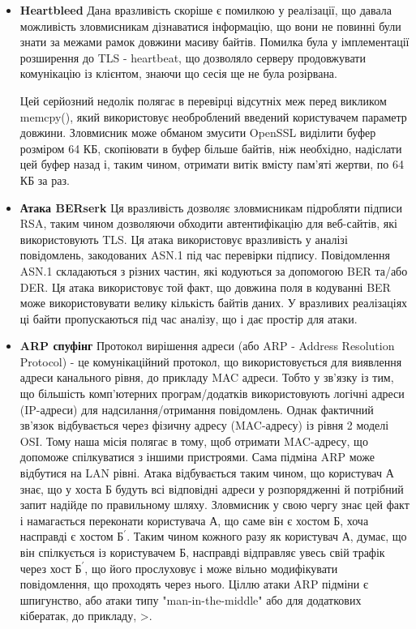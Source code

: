\begin{itemize}
    
    \item \textbf{Heartbleed}
    Дана вразливість скоріше є помилкою у реалізації, що давала можливість зловмисникам дізнаватися інформацію, що вони не повинні були знати за межами рамок довжини масиву байтів. Помилка була у імплементації розширення до TLS - heartbeat, що дозволяло серверу продовжувати комунікацію із клієнтом, знаючи що сесія ще не була розірвана.
    
    Цей серйозний недолік полягає в перевірці відсутніх меж перед викликом memcpy(), який використовує необроблений введений користувачем параметр довжини. Зловмисник може обманом змусити OpenSSL виділити буфер розміром 64 КБ, скопіювати в буфер більше байтів, ніж необхідно, надіслати цей буфер назад і, таким чином, отримати витік вмісту пам’яті жертви, по 64 КБ за раз.
        
    
    \item \textbf{Атака BERserk}
    Ця вразливість дозволяє зловмисникам підробляти підписи RSA, таким чином дозволяючи обходити автентифікацію для веб-сайтів, які використовують TLS. Ця атака використовує вразливість у аналізі повідомлень, закодованих ASN.1 під час перевірки підпису. Повідомлення ASN.1 складаються з різних частин, які кодуються за допомогою BER та/або DER. Ця атака використовує той факт, що довжина поля в кодуванні BER може використовувати велику кількість байтів даних. У вразливих реалізаціях ці байти пропускаються під час аналізу, що і дає простір для атаки.
    
    \item \textbf{ARP спуфінг}
    Протокол вирішення адреси (або ARP - Address Resolution Protocol) - це комунікаційний протокол, що використовується для виявлення адреси канального рівня, до прикладу MAC адреси. Тобто у зв'язку із тим, що більшість комп’ютерних програм/додатків використовують логічні адреси (IP-адреси) для надсилання/отримання повідомлень. Однак фактичний зв’язок відбувається через фізичну адресу (MAC-адресу) із рівня 2 моделі OSI. Тому наша місія полягає в тому, щоб отримати MAC-адресу, що допоможе спілкуватися з іншими пристроями.
    Сама підміна ARP може відбутися на LAN рівні. Атака відбувається таким чином, що користувач А знає, що у хоста Б будуть всі відповідні адреси у розпорядженні й потрібний запит надійде по правильному шляху. Зловмисник у свою чергу знає цей факт і намагається переконати користувача А, що саме він є хостом Б, хоча насправді є хостом $\text{Б}^{'}$. Таким чином кожного разу як користувач А, думає, що він спілкується із користувачем Б, насправді відправляє увесь свій трафік через хост $\text{Б}^{'}$, що його прослуховує і може вільно модифікувати повідомлення, що проходять через нього.
    Ціллю атаки ARP підміни є шпигунство, або атаки типу "man-in-the-middle" або для додаткових кібератак, до прикладу, >.
    
\end{itemize}
